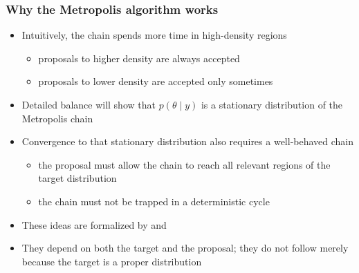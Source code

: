 \documentclass[10pt]{beamer}
\begin{document}
 \begin{frame}

\frametitle{Why the Metropolis algorithm works}

  \small
  \begin{itemize}
  \item Intuitively, the chain spends more time in high-density regions
    \begin{itemize}
    \item proposals to higher density are always accepted
    \item proposals to lower density are accepted only sometimes
    \end{itemize}
  \pause
  \item Detailed balance will show that $p(\theta\mid y)$ is a
    stationary distribution of the Metropolis chain
  \pause
  \item Convergence to that stationary distribution also requires a
    well-behaved chain
    \begin{itemize}
    \item the proposal must allow the chain to reach all relevant regions
      of the target distribution
    \item the chain must not be trapped in a deterministic cycle
    \end{itemize}
  \pause
  \item<4-> These ideas are formalized by  and
  \item<5-> They depend on both the target and the proposal; they do not
    follow merely because the target is a proper distribution
  \end{itemize}

\end{frame}
\end{document}
